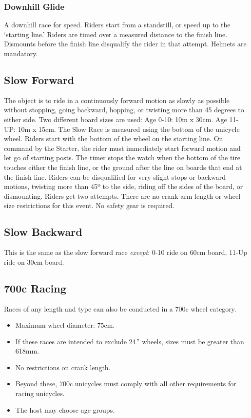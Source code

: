 \subsubsection{Downhill Glide}
A downhill race for speed.
Riders start from a standstill, or speed up to the ‘starting line.’ Riders are timed over a measured distance to the finish line.
Dismounts before the finish line disqualify the rider in that attempt.
Helmets are mandatory.

\subsection{Slow Forward}
The object is to ride in a continuously forward motion as slowly as possible without stopping, going backward, hopping, or twisting more than 45 degrees to either side.
Two different board sizes are used: Age 0-10: 10m x 30cm.
Age 11-UP: 10m x 15cm.
The Slow Race is measured using the bottom of the unicycle wheel.
Riders start with the bottom of the wheel on the starting line.
On command by the Starter, the rider must immediately start forward motion and let go of starting posts.
The timer stops the watch when the bottom of the tire touches either the finish line, or the ground after the line on boards that end at the finish line.
Riders can be disqualified for very slight stops or backward motions, twisting more than 45º to the side, riding off the sides of the board, or dismounting.
Riders get two attempts.
There are no crank arm length or wheel size restrictions for this event.
No safety gear is required.

\subsection{Slow Backward}
This is the same as the slow forward race \textit{except}: 0-10 ride on 60cm board, 11-Up ride on 30cm board.

\subsection{700c Racing}
Races of any length and type can also be conducted in a 700c wheel category.
\begin{itemize}
\item Maximum wheel diameter: 75cm.
\item If these races are intended to exclude 24$"$ wheels, sizes must be greater than 618mm.
\item No restrictions on crank length.
\item Beyond these, 700c unicycles must comply with all other requirements for racing unicycles.
\item The host may choose age groups.
\end{itemize}

